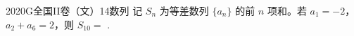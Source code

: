 
\begin{problem}{2020}{G}{全国II卷（文）}{14}{数列}
记 $ S_n $ 为等差数列 $ \{a_n\} $ 的前 $ n $ 项和。若 $ a_1=-2 $，$ a_2+a_6=2 $，则 $ S_{10}= $ \underline{\hspace{4em}}.
\end{problem}

\begin{answer}

\end{answer}

\begin{solutions}

\end{solutions}